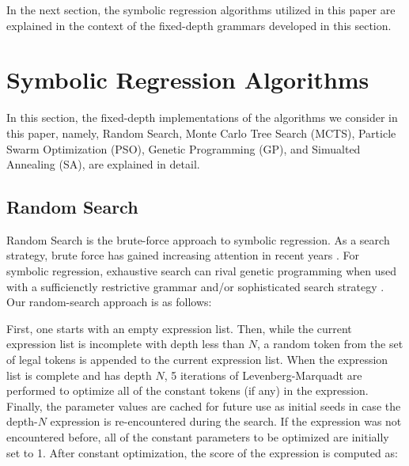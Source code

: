 \documentclass[runningheads]{llncs}
\begin{document}



    

In the next section, the symbolic regression algorithms utilized in this paper are explained in the context of the fixed-depth grammars developed in this section.

\section{Symbolic Regression Algorithms}\label{sec:SymbolicRegressionAlgorithms}

In this section, the fixed-depth implementations of the algorithms we consider in this paper, namely, Random Search, Monte Carlo Tree Search (MCTS), Particle Swarm Optimization (PSO), Genetic Programming (GP), and Simualted Annealing (SA), are explained in detail.

\subsection{Random Search}\label{subsec:RandomSearch}

Random Search is the brute-force approach to symbolic regression.  As a search strategy, brute force has gained increasing attention in recent years \cite{Heule2017TheSO}. For symbolic regression, exhaustive search can rival genetic programming when used with a sufficienctly restrictive grammar \cite{Kammerer2020} and/or sophisticated search strategy \cite{udrescu2020ai}.
Our random-search approach is as follows:
\par First, one starts with an empty expression list. Then, while the current expression list is incomplete with depth less than $N$, a random token from the set of legal tokens is appended to the current expression list. When the expression list is complete and has depth $N$, 5 iterations of Levenberg-Marquadt are performed to optimize all of the constant tokens (if any) in the expression. Finally, the parameter values are cached for future use as initial seeds in case the depth-$N$ expression is re-encountered during the search. If the expression was not encountered before, all of the constant parameters to be optimized are initially set to 1. After constant optimization, the score of the expression is computed as:
\end{document}
